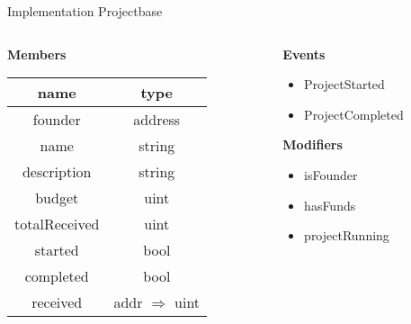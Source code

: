 \documentclass{beamer}
\begin{document}
\begin{frame}{Implementation Projectbase}
\begin{columns}
\begin{column}{0.55\textwidth}
\begin{center}
\textbf{Members}\\
\vspace{3mm}
	\begin{tabular}{c|c}
		name & type \\
		\hline
		 founder & address \\
		 name & string \\
		 description & string \\
		 budget & uint \\
		 totalReceived & uint \\
		 started & bool \\
		 completed & bool \\
		 received & addr $\Rightarrow$ uint \\
	\end{tabular}
\end{center}
\end{column}
\begin{column}{0.45\textwidth}
\begin{center}
\textbf{Events}\\
\vspace{1mm}
\begin{itemize}
	\item ProjectStarted
	\item ProjectCompleted
\end{itemize}
\vspace{8mm}
\textbf{Modifiers}\\
\vspace{1mm}
\begin{itemize}
	\item isFounder
	\item hasFunds
	\item projectRunning
\end{itemize}
\end{center}
\end{column}
\end{columns}
\end{frame}
\end{document}
